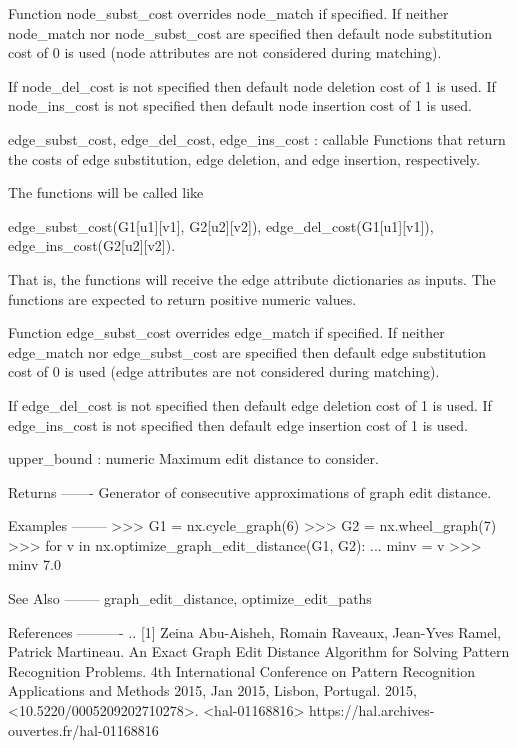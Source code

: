 \begin{DoxyVerb}
    Function node_subst_cost overrides node_match if specified.
    If neither node_match nor node_subst_cost are specified then
    default node substitution cost of 0 is used (node attributes
    are not considered during matching).

    If node_del_cost is not specified then default node deletion
    cost of 1 is used.  If node_ins_cost is not specified then
    default node insertion cost of 1 is used.

edge_subst_cost, edge_del_cost, edge_ins_cost : callable
    Functions that return the costs of edge substitution, edge
    deletion, and edge insertion, respectively.

    The functions will be called like

       edge_subst_cost(G1[u1][v1], G2[u2][v2]),
       edge_del_cost(G1[u1][v1]),
       edge_ins_cost(G2[u2][v2]).

    That is, the functions will receive the edge attribute
    dictionaries as inputs.  The functions are expected to return
    positive numeric values.

    Function edge_subst_cost overrides edge_match if specified.
    If neither edge_match nor edge_subst_cost are specified then
    default edge substitution cost of 0 is used (edge attributes
    are not considered during matching).

    If edge_del_cost is not specified then default edge deletion
    cost of 1 is used.  If edge_ins_cost is not specified then
    default edge insertion cost of 1 is used.

upper_bound : numeric
    Maximum edit distance to consider.

Returns
-------
Generator of consecutive approximations of graph edit distance.

Examples
--------
>>> G1 = nx.cycle_graph(6)
>>> G2 = nx.wheel_graph(7)
>>> for v in nx.optimize_graph_edit_distance(G1, G2):
...     minv = v
>>> minv
7.0

See Also
--------
graph_edit_distance, optimize_edit_paths

References
----------
.. [1] Zeina Abu-Aisheh, Romain Raveaux, Jean-Yves Ramel, Patrick
   Martineau. An Exact Graph Edit Distance Algorithm for Solving
   Pattern Recognition Problems. 4th International Conference on
   Pattern Recognition Applications and Methods 2015, Jan 2015,
   Lisbon, Portugal. 2015,
   <10.5220/0005209202710278>. <hal-01168816>
   https://hal.archives-ouvertes.fr/hal-01168816
\end{DoxyVerb}
 \mbox{\label{namespacenetworkx_1_1algorithms_1_1similarity_a3048856cdc525be8a48d87b458e16a14}} 
